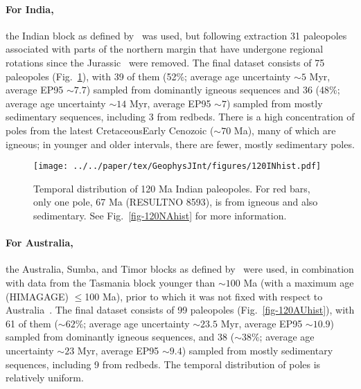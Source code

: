 \paragraph{For India,}
the Indian block as defined by~\citet{Y18} was used, but following extraction 31
paleopoles associated with parts of the northern margin that have undergone
regional rotations since the Jurassic~\citep{G15} were removed. The final
dataset consists of 75 paleopoles (Fig.~\ref{fig-120INhist}), with 39 of them
(52\%; average age uncertainty ${\sim}5$ Myr, average EP95 ${\sim}7.7$\degree)
sampled from dominantly igneous sequences and 36 (48\%; average age uncertainty
${\sim}14$ Myr, average EP95 ${\sim}7$\degree) sampled from mostly sedimentary
sequences, including 3 from redbeds. There is a high concentration of poles from
the latest Cretaceous\textendash{}Early Cenozoic (${\sim}70$ Ma),
many of which are igneous; in younger and older intervals, there are fewer,
mostly sedimentary poles.

\begin{figure}
  \centering
  \texttt{[image: ../../paper/tex/GeophysJInt/figures/120INhist.pdf]}
  \caption[Distribution of 120 Ma Indian paleopoles]{Temporal
    distribution of 120 Ma Indian paleopoles. For red bars, only one
    pole, 67 Ma (RESULTNO 8593), is from igneous and also
    sedimentary. See Fig.~\ref{fig-120NAhist} for more information.}\label{fig-120INhist}
\end{figure}

\paragraph{For Australia,}
the Australia, Sumba, and Timor blocks as defined by~\citet{Y18} were used, in
combination with data from the Tasmania block younger than ${\sim}100$ Ma (with
a maximum age (HIMAGAGE) $\leq$100 Ma), prior to which it was not fixed with
respect to Australia~\citep{Y18}. The final dataset consists of 99 paleopoles
(Fig.~\ref{fig-120AUhist}), with 61 of them (${\sim}62$\%; average age
uncertainty ${\sim}23.5$ Myr, average EP95 ${\sim}10.9$\degree) sampled from
dominantly igneous sequences, and 38 (${\sim}38$\%; average age uncertainty
${\sim}23$ Myr, average EP95 ${\sim}9.4$\degree) sampled from mostly sedimentary
sequences, including 9 from redbeds. The temporal distribution of poles is
relatively uniform.

